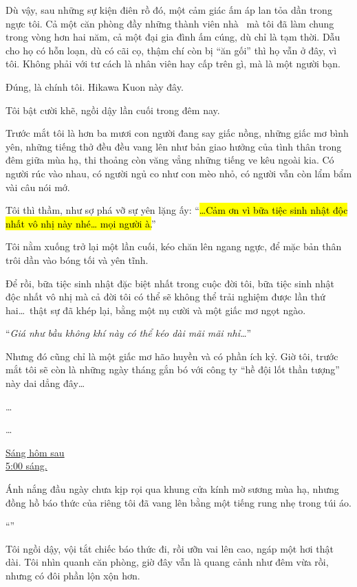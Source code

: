 \documentclass[../main.tex]{subfiles}
\begin{document}
Dù vậy, sau những sự kiện điên rồ đó, một cảm giác ấm áp lan tỏa dần trong ngực tôi. Cả một căn phòng đầy những thành viên nhà \hll\ mà tôi đã làm chung trong vòng hơn hai năm, cả một đại gia đình ấm cúng, dù chỉ là tạm thời. Dẫu cho họ có hỗn loạn, dù có cãi cọ, thậm chí còn bị ``ăn gối'' thì họ vẫn ở đây, vì tôi. Không phải với tư cách là nhân viên hay cấp trên gì, mà là một người bạn.

Đúng, là chính tôi. Hikawa Kuon này đây.

Tôi bật cười khẽ, ngồi dậy lần cuối trong đêm nay.

Trước mắt tôi là hơn ba mươi con người đang say giấc nồng, những giấc mơ bình yên, những tiếng thở đều đều vang lên như bản giao hưởng của tình thân trong đêm giữa mùa hạ, thi thoảng còn văng vẳng những tiếng ve kêu ngoài kia. Có người rúc vào nhau, có người ngủ co như con mèo nhỏ, có người vẫn còn lẩm bẩm vài câu nói mớ.

Tôi thì thầm, như sợ phá vỡ sự yên lặng ấy: ``\hl{\dots Cảm ơn vì bữa tiệc sinh nhật độc nhất vô nhị này nhé\dots{} mọi người à.}''

Tôi nằm xuống trở lại một lần cuối, kéo chăn lên ngang ngực, để mặc bản thân trôi dần vào bóng tối và yên tĩnh.

Để rồi, bữa tiệc sinh nhật đặc biệt nhất trong cuộc đời tôi, bữa tiệc sinh nhật độc nhất vô nhị mà cả đời tôi có thể sẽ không thể trải nghiệm được lần thứ hai\dots\ thật sự đã khép lại, bằng một nụ cười và một giấc mơ ngọt ngào.

``\textit{Giá như bầu không khí này có thể kéo dài mãi mãi nhỉ\dots}''

Nhưng đó cũng chỉ là một giấc mơ hão huyền và có phần ích kỷ. Giờ tôi, trước mắt tôi sẽ còn là những ngày tháng gắn bó với công ty ``hề đội lốt thần tượng'' này dai dẳng đây\dots

\dots

\dots

\begin{center}
    \uline{Sáng hôm sau\\5:00 sáng.}
\end{center}

Ánh nắng đầu ngày chưa kịp rọi qua khung cửa kính mờ sương mùa hạ, nhưng đồng hồ báo thức của riêng tôi đã vang lên bằng một tiếng rung nhẹ trong túi áo.

``''

Tôi ngồi dậy, vội tắt chiếc báo thức đi, rồi ưỡn vai lên cao, ngáp một hơi thật dài. Tôi nhìn quanh căn phòng, giờ đây vẫn là quang cảnh như đêm vừa rồi, nhưng có đôi phần lộn xộn hơn.
\end{document}
